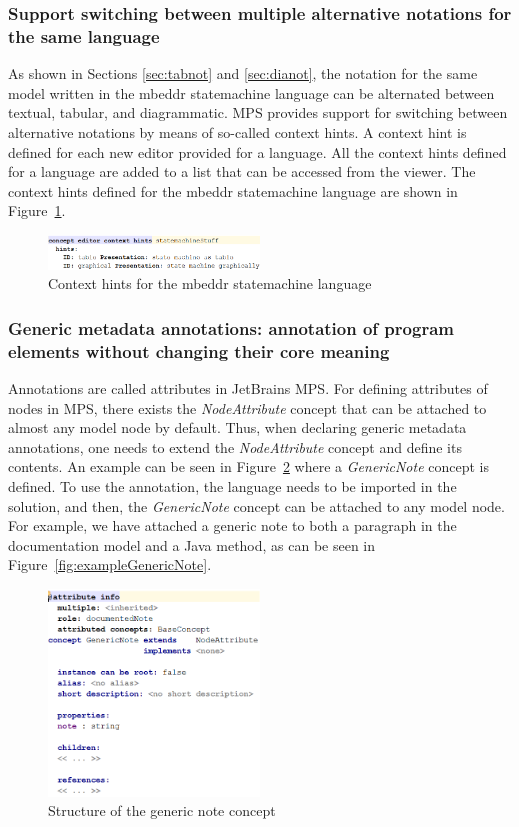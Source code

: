 \documentclass[preprint,numbers,10pt]{sigplanconf}
\begin{document}
\subsubsection{Support switching between multiple alternative notations for the same language}
As shown in Sections \ref{sec:tabnot} and \ref{sec:dianot}, the notation for the same model written
in the mbeddr statemachine language can be alternated between textual, tabular, and diagrammatic.
MPS provides support for switching between alternative notations by means of so-called context hints.
A context hint is defined for each new editor provided for a language.
All the context hints defined for a language are added to a list that can be accessed from the viewer.
The context hints defined for the mbeddr statemachine language are shown in Figure~\ref{fig:contextHints}.

\begin{figure}[H]
	\centering
	\includegraphics[width=0.50\textwidth]{screens/ContextHints.png}
	\caption{Context hints for the mbeddr statemachine language}
	\label{fig:contextHints}
\end{figure}

\subsubsection{Generic metadata annotations: annotation of program elements without changing their core meaning}
Annotations are called attributes in JetBrains MPS.
For defining attributes of nodes in MPS, there exists the \emph{NodeAttribute} concept that can be attached
to almost any model node by default. Thus, when declaring generic metadata annotations, one needs to extend the \emph{NodeAttribute}
concept and define its contents. An example can be seen in Figure~\ref{fig:GenericNote} where a \emph{GenericNote} concept is defined.
To use the annotation, the language needs to be imported in the solution, and then, the \emph{GenericNote} concept can be attached to any
model node. For example, we have attached a generic note to both a paragraph in the documentation model and
a Java method, as can be seen in Figure~\ref{fig:exampleGenericNote}.

\begin{figure}[H]
	\centering
	\includegraphics[width=0.50\textwidth]{screens/GenericNoteImpl.png}
	\caption{Structure of the generic note concept}
	\label{fig:GenericNote}
\end{figure}
\end{document}
